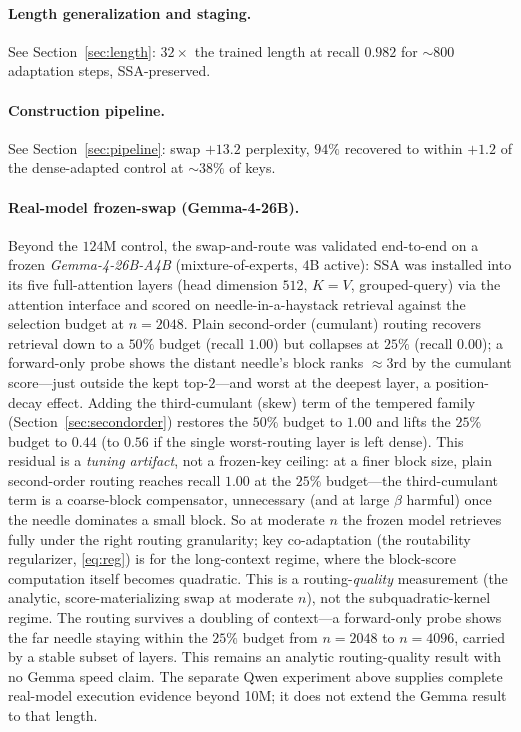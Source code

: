 \documentclass[11pt]{article}
\numberwithin{equation}{section}
\begin{document}
\paragraph{Length generalization and staging.} See Section~\ref{sec:length}: $32\times$ the trained length at
recall $0.982$ for ${\sim}800$ adaptation steps, SSA-preserved.

\paragraph{Construction pipeline.} See Section~\ref{sec:pipeline}: swap $+13.2$ perplexity, $94\%$ recovered to
within $+1.2$ of the dense-adapted control at ${\sim}38\%$ of keys.

\paragraph{Real-model frozen-swap (Gemma-4-26B).} Beyond the $124$M control, the swap-and-route was
validated end-to-end on a frozen \emph{Gemma-4-26B-A4B} (mixture-of-experts, $4$B active): SSA was installed
into its five full-attention layers (head dimension $512$, $K{=}V$, grouped-query) via the attention
interface and scored on needle-in-a-haystack retrieval against the selection budget at $n=2048$. Plain
second-order (cumulant) routing recovers retrieval down to a $50\%$ budget (recall $1.00$) but collapses at
$25\%$ (recall $0.00$); a forward-only probe shows the distant needle's block ranks ${\approx}3$rd by the
cumulant score---just outside the kept top-$2$---and worst at the deepest layer, a position-decay effect.
Adding the third-cumulant (skew) term of the tempered family (Section~\ref{sec:secondorder}) restores the
$50\%$ budget to $1.00$ and lifts the $25\%$ budget to $0.44$ (to $0.56$ if the single worst-routing layer is
left dense). This residual is a \emph{tuning artifact}, not a frozen-key ceiling: at a finer block size,
plain second-order routing reaches recall $1.00$ at the $25\%$ budget---the third-cumulant term is a
coarse-block compensator, unnecessary (and at large $\beta$ harmful) once the needle dominates a small block.
So at moderate $n$ the frozen model retrieves fully under the right routing granularity; key co-adaptation
(the routability regularizer, \eqref{eq:reg}) is for the long-context regime, where the block-score
computation itself becomes quadratic. This is a routing-\emph{quality} measurement (the analytic,
score-materializing swap at moderate $n$), not the subquadratic-kernel regime. The routing survives a
doubling of context---a forward-only probe shows the far needle staying within the $25\%$ budget from $n=2048$
to $n=4096$, carried by a stable subset of layers. This remains an analytic routing-quality result with no
Gemma speed claim. The separate Qwen experiment above supplies complete real-model execution evidence beyond
10M; it does not extend the Gemma result to that length.
\end{document}
